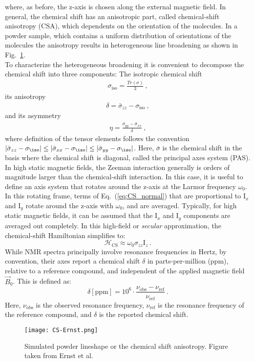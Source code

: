 where, as before, the z-axis is chosen along the external magnetic field. In general, the chemical shift has an anisotropic part, called chemical-shift anisotropy (CSA), which dependents on the orientation of the molecules. In a powder sample, which contains a uniform distribution of orientations of the molecules the anisotropy results in heterogeneous line broadening as shown in Fig.~\ref{fig:CS-ernst}.\\
To characterize the heterogeneous broadening it is convenient to decompose the chemical shift into three components: The isotropic chemical shift
\begin{align}
  \sigma_{\textrm{iso}}  = \frac{Tr(\sigma)}{3}~,
\end{align}
its anisotropy
\begin{align}
  \delta=\bar \sigma_{zz}-  \sigma_{\textrm{iso}}~, 
\end{align}
and its asymmetry
\begin{align}
  \eta=\frac{\bar \sigma_{yy}-\bar\sigma_{xx}}{\delta}~,
\end{align}
where definition of the tensor elements follows the convention $|\bar\sigma_{zz}  - \sigma_\iso | \leq |\bar\sigma_{xx} -\sigma_{\iso} | \leq |\bar\sigma_{yy} - \sigma_{\iso}|$.
Here, $\bar \sigma$ is the chemical shift in the basis where the chemical shift is diagonal, called the principal axes system (PAS). 
In high static magnetic fields, the Zeeman interaction generally is orders of magnitude larger than the chemical\nobreakdash-shift interaction. In this case, it is useful to define an axis system that rotates around the z-axis at the Larmor frequency $\omega_0$. In this rotating frame, terms of Eq.~(\ref{eq:CS_normal}) that are proportional to ${\textrm{I}}_x$ and ${\textrm{I}}_y$ rotate around the z-axis with $\omega_0$, and are averaged. Typically, for high static magnetic fields, it can be assumed that the ${\textrm{I}}_x$ and ${\textrm{I}}_y$ components are averaged out completely. In this high\nobreakdash-field or \textit{secular} approximation, the chemical\nobreakdash-shift Hamiltonian simplifies to:
\begin{equation}
\mathcal{{H}}_{\text{CS}}\approx\omega_0\sigma_{zz}{\textrm{I}}_{z}~.
\label{eq:CS_secular}
\end{equation}
While NMR spectra principally involve resonance frequencies in Hertz, by convention, their axes report a chemical shift $\delta$ in parts\nobreakdash-per\nobreakdash-million (ppm), relative to a reference compound, and independent of the applied magnetic field $\vec B_0$. This is defined as:
\begin{equation}
\delta\left[\textrm{ppm}\right] = 10^6\cdot\frac{\nu_{\textrm{obs}}-\nu_{\textrm{ref}}}{\nu_{\textrm{ref}}}~.
\end{equation}
Here, $\nu_{\textrm{obs}}$ is the observed resonance frequency, $\nu_{\textrm{ref}}$ is the resonance frequency of the reference compound, and $\delta$ is the reported chemical shift.
\begin{figure}[H]
  \centering
  \texttt{[image: CS-Ernst.png]}
  \caption{\label{fig:CS-ernst} Simulated powder lineshape or the chemical shift anisotropy. Figure taken from Ernst et al. \cite{Script}}
\end{figure}
